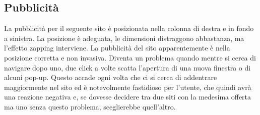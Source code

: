 \subsection{Pubblicità} \label{Pubblicità}
La pubblicità per il seguente sito è posizionata nella colonna di destra e in fondo a sinistra. La posizione è adeguata, le dimensioni distraggono abbastanza, ma l'effetto zapping interviene. La pubblicità del sito apparentemente è nella posizione corretta e non invasiva. Diventa un problema quando mentre si cerca di navigare dopo uno, due click a volte scatta l'apertura di una nuova finestra o di alcuni pop-up. Questo accade ogni volta che ci si cerca di addentrare maggiormente nel sito ed è notevolmente fastidioso per l'utente, che quindi avrà una reazione negativa e, se dovesse decidere tra due siti con la medesima offerta ma uno senza questo problema, sceglierebbe quell'altro. 